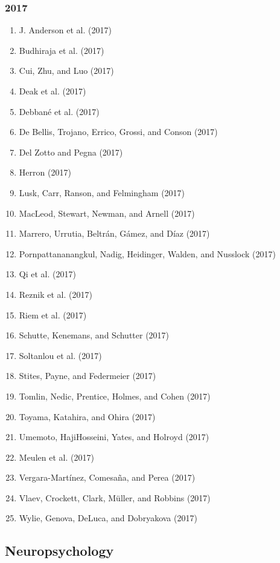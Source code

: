 \documentclass[english,man]{apa6}
\providecommand{\tightlist}{%
  \setlength{\itemsep}{0pt}\setlength{\parskip}{0pt}}
\theoremstyle{definition}
\theoremstyle{definition}
\theoremstyle{definition}
\theoremstyle{remark}
\begin{document}
\subsubsection{2017}\label{section-37}

\begin{enumerate}
\def\labelenumi{\arabic{enumi})}
\tightlist
\item
  J. Anderson et al. (2017)
\item
  Budhiraja et al. (2017)
\item
  Cui, Zhu, and Luo (2017)
\item
  Deak et al. (2017)
\item
  Debbané et al. (2017)
\item
  De Bellis, Trojano, Errico, Grossi, and Conson (2017)
\item
  Del Zotto and Pegna (2017)
\item
  Herron (2017)
\item
  Lusk, Carr, Ranson, and Felmingham (2017)
\item
  MacLeod, Stewart, Newman, and Arnell (2017)
\item
  Marrero, Urrutia, Beltrán, Gámez, and Díaz (2017)
\item
  Pornpattananangkul, Nadig, Heidinger, Walden, and Nusslock (2017)
\item
  Qi et al. (2017)
\item
  Reznik et al. (2017)
\item
  Riem et al. (2017)
\item
  Schutte, Kenemans, and Schutter (2017)
\item
  Soltanlou et al. (2017)
\item
  Stites, Payne, and Federmeier (2017)
\item
  Tomlin, Nedic, Prentice, Holmes, and Cohen (2017)
\item
  Toyama, Katahira, and Ohira (2017)
\item
  Umemoto, HajiHosseini, Yates, and Holroyd (2017)
\item
  Meulen et al. (2017)
\item
  Vergara-Martínez, Comesaña, and Perea (2017)
\item
  Vlaev, Crockett, Clark, Müller, and Robbins (2017)
\item
  Wylie, Genova, DeLuca, and Dobryakova (2017)
\end{enumerate}

\subsection{Neuropsychology}\label{neuropsychology}
\end{document}
